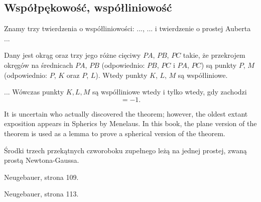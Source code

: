 \subsection{Współpękowość, współliniowość}

Znamy trzy twierdzenia o współliniowości: ..., ... i twierdzenie o prostej Auberta ...

\begin{proposition}
	Dany jest okrąg oraz trzy jego różne cięciwy $PA$, $PB$, $PC$ takie, że przekrojem okręgów na średnicach $PA$, $PB$ (odpowiednio: $PB$, $PC$ i $PA$, $PC$) są punkty $P$, $M$ (odpowiednio: $P$, $K$ oraz $P$, $L$).
	Wtedy punkty $K$, $L$, $M$ są współliniowe.
\end{proposition}

\begin{proposition}
	...
	Wówczas punkty $K, L, M$ są współliniowe wtedy i tylko wtedy, gdy zachodzi
	\begin{equation}
		[AMB] [BKC] [CLA] = -1.
	\end{equation}
\end{proposition}
It is uncertain who actually discovered the theorem; however, the oldest extant exposition appears in Spherics by Menelaus. In this book, the plane version of the theorem is used as a lemma to prove a spherical version of the theorem.



\begin{proposition}
	Środki trzech przekątnych czworoboku zupełnego leżą na jednej prostej, zwaną prostą Newtona-Gaussa.
\end{proposition}

\begin{proposition}
	Neugebauer, strona 109.
\end{proposition}

\begin{proposition}
	Neugebauer, strona 113.
\end{proposition}

